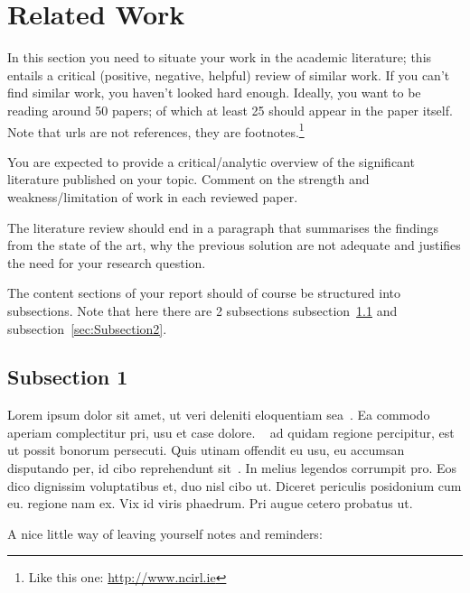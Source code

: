 
\section{Related Work}
\label{sec:rw}

In this section you need to situate your work in the academic literature; this entails a critical (positive, negative, helpful) review of similar work. If you can't find similar work, you haven't looked hard enough. Ideally, you want to be reading around 50 papers; of which at least 25 should appear in the paper itself. Note that urls are not references, they are footnotes.\footnote{Like this one: \url{http://www.ncirl.ie}}

You are expected to provide a critical/analytic overview of the significant literature published on your topic. Comment on the strength and weakness/limitation of work in each reviewed paper. 

The literature review should end in  a paragraph that summarises the findings from the state of the art, why the previous solution are not adequate and justifies the need for your research question.

The content sections of your report should of course be structured into subsections. Note that here there are 2 subsections subsection~\ref{sec:Subsection1} and subsection~\ref{sec:Subsection2}.

\subsection{Subsection 1}
\label{sec:Subsection1}

Lorem ipsum dolor sit amet, ut veri deleniti eloquentiam sea~\citep{FengB16}. Ea commodo aperiam complectitur pri, usu et case dolore. ~\citet{KuneKARB16} ad quidam regione percipitur, est ut possit bonorum persecuti. Quis utinam offendit eu usu, eu accumsan disputando per, id cibo reprehendunt sit~\citep{BeloglazovB15,GomesCT15}. In melius legendos corrumpit pro. Eos dico dignissim voluptatibus et, duo nisl cibo ut. Diceret periculis posidonium cum eu. \citet{GomesCT15} regione nam ex. Vix id viris phaedrum. Pri augue cetero probatus ut.

A nice little way of leaving yourself notes and reminders:



